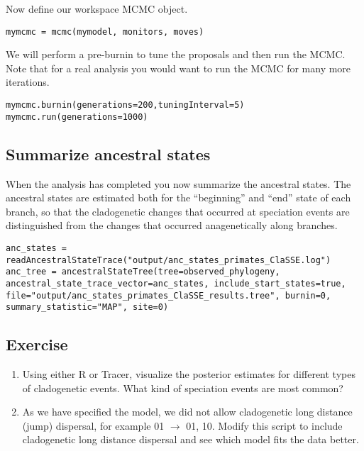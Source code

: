 Now define our workspace MCMC object.
{\tt \begin{snugshade*}
\begin{lstlisting}
mymcmc = mcmc(mymodel, monitors, moves)
\end{lstlisting}
\end{snugshade*}}

We will perform a pre-burnin to tune the proposals
and then run the MCMC. Note that for a real analysis you would
want to run the MCMC for many more iterations.
{\tt \begin{snugshade*}
\begin{lstlisting}
mymcmc.burnin(generations=200,tuningInterval=5)
mymcmc.run(generations=1000)
\end{lstlisting}
\end{snugshade*}}

\subsection{Summarize ancestral states}

When the analysis has completed you now summarize the ancestral states.
The ancestral states are estimated both for the ``beginning'' and ``end''
state of each branch, so that the cladogenetic changes that occurred at speciation events
are distinguished from the changes that occurred anagenetically along branches.
{\tt \begin{snugshade*}
\begin{lstlisting}
anc_states = readAncestralStateTrace("output/anc_states_primates_ClaSSE.log")
anc_tree = ancestralStateTree(tree=observed_phylogeny, ancestral_state_trace_vector=anc_states, include_start_states=true, file="output/anc_states_primates_ClaSSE_results.tree", burnin=0, summary_statistic="MAP", site=0)
\end{lstlisting}
\end{snugshade*}}


\subsection{Exercise}

\begin{enumerate}
\item Using either R or Tracer, visualize the posterior estimates for different types of cladogenetic events. 
    What kind of speciation events are most common?
\item As we have specified the model, we did not allow cladogenetic long
    distance (jump) dispersal, for example 01 $\rightarrow$ 01, 10.
    Modify this script to include cladogenetic 
    long distance dispersal and see which model fits the data better.
\end{enumerate}

\newpage


